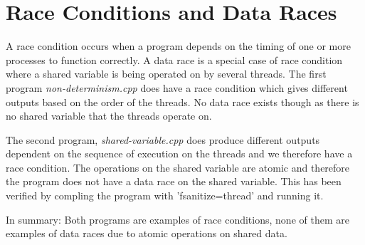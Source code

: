 \section{Race Conditions and Data Races}

A race condition occurs when a program depends on the timing of one or more
processes to function correctly. A data race is a special case of race condition
where a shared variable is being operated on by several threads. The first 
program \textit{non-determinism.cpp} does have a race condition which gives 
different outputs based on the order of the threads. No data race exists though 
as there is no shared variable that the threads operate on. 

The second program, \textit{shared-variable.cpp} does produce different outputs
dependent on the sequence of execution on the threads and we therefore
have a race condition. The operations on the shared variable are atomic and 
therefore the program does not have a data race on the shared variable.
This has been verified by compling the program with 'fsanitize=thread' and 
running it.

In summary: Both programs are examples of race conditions, none of them are 
examples of data races due to atomic operations on shared data.